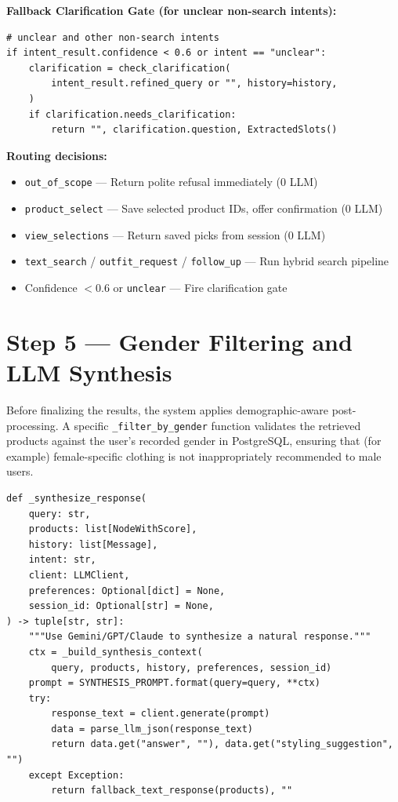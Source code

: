 \textbf{Fallback Clarification Gate (for unclear non-search intents):}
\begin{lstlisting}[caption={Confidence-based clarification fallback --- agent/fashion\_agent.py}]
# unclear and other non-search intents
if intent_result.confidence < 0.6 or intent == "unclear":
    clarification = check_clarification(
        intent_result.refined_query or "", history=history,
    )
    if clarification.needs_clarification:
        return "", clarification.question, ExtractedSlots()
\end{lstlisting}

\textbf{Routing decisions:}
\begin{itemize}
    \item \texttt{out\_of\_scope} --- Return polite refusal immediately (0 LLM)
    \item \texttt{product\_select} --- Save selected product IDs, offer confirmation (0 LLM)
    \item \texttt{view\_selections} --- Return saved picks from session (0 LLM)
    \item \texttt{text\_search} / \texttt{outfit\_request} / \texttt{follow\_up} --- Run hybrid search pipeline
    \item Confidence $< 0.6$ or \texttt{unclear} --- Fire clarification gate
\end{itemize}

\section{Step 5 --- Gender Filtering and LLM Synthesis}

Before finalizing the results, the system applies demographic-aware post-processing. A specific \texttt{\_filter\_by\_gender} function validates the retrieved products against the user's recorded gender in PostgreSQL, ensuring that (for example) female-specific clothing is not inappropriately recommended to male users.

\begin{lstlisting}[caption={LLM Synthesis --- agent/fashion\_agent.py}]
def _synthesize_response(
    query: str,
    products: list[NodeWithScore],
    history: list[Message],
    intent: str,
    client: LLMClient,
    preferences: Optional[dict] = None,
    session_id: Optional[str] = None,
) -> tuple[str, str]:
    """Use Gemini/GPT/Claude to synthesize a natural response."""
    ctx = _build_synthesis_context(
        query, products, history, preferences, session_id)
    prompt = SYNTHESIS_PROMPT.format(query=query, **ctx)
    try:
        response_text = client.generate(prompt)
        data = parse_llm_json(response_text)
        return data.get("answer", ""), data.get("styling_suggestion", "")
    except Exception:
        return fallback_text_response(products), ""
\end{lstlisting}


